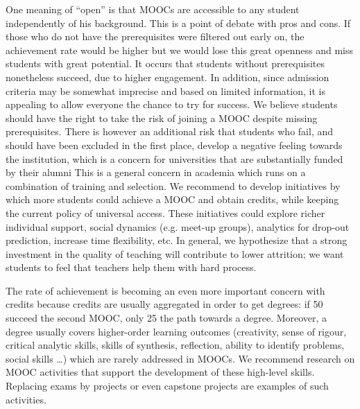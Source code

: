 One meaning of  
``open''  is that MOOCs are accessible to any
student independently of his background. This is a point of debate with
pros and cons. If those who do not have the prerequisites were filtered
out early on, the achievement rate would be higher but we would lose
this great openness and miss students with great potential. It occurs
that students without prerequisites nonetheless succeed, due to higher
engagement. In addition, since admission criteria may be somewhat
imprecise and based on limited information, it is appealing to allow
everyone the chance to try for success. We believe students should have
the right to take the risk of joining a MOOC despite missing
prerequisites. There is however an additional risk that students who
fail, and should have been excluded in the first place, develop a
negative feeling towards the institution, which is a concern for
universities that are substantially funded by their alumni 
 This is a
general concern in academia which runs on a combination of training and
selection.  We recommend to develop initiatives by which more students
could achieve a MOOC and obtain credits, while keeping the current
policy of universal access. These initiatives could explore richer
individual support, social dynamics (e.g. meet-up groups), analytics for
drop-out prediction, increase time flexibility, etc. In general, we
hypothesize that a strong investment in the quality of teaching will
contribute to lower attrition; we want students to feel that teachers
help them with hard process.

The rate of achievement is becoming an even more important concern with
credits because credits are usually aggregated in order to get degrees:
if 50%
succeed the second MOOC, only 25%
the path towards a degree. Moreover, a degree usually covers
higher-order learning outcomes (creativity, sense of rigour, critical
analytic skills, skills of synthesis, reflection, ability to identify
problems, social skills …) which are rarely addressed in MOOCs. We
recommend research on MOOC activities that support the development of
these high-level skills. Replacing exams by projects or even capstone
projects are examples of such activities.


